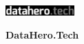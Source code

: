 \documentclass[\main/boa.tex]{subfiles}
\begin{document}
	
	\begin{minipage}[t]{0.915\textwidth}
		\center     
		\includegraphics[width=100px]{img/logos.bw/logo_dh.png} 
	\end{minipage}
	
	\Large \textbf {DataHero.Tech}
	
	
	\vskip 0.3cm
	\normalsize 

	\vskip 1.5cm
\end{document}
